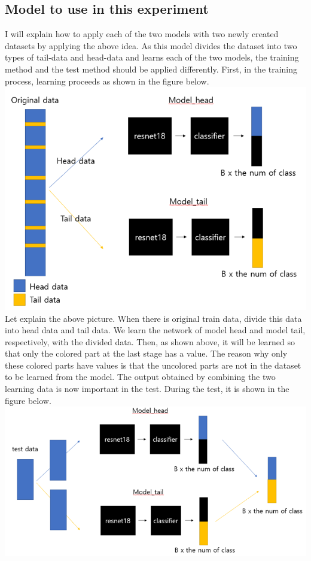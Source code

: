 \documentclass[extendedabs]{bmvc2k}
\begin{document}
  \subsection{Model to use in this experiment}
    \quad I will explain how to apply each of the two models with two newly created datasets by applying the above idea.
    As this model divides the dataset into two types of tail-data and head-data and learns each of the two models, 
    the training method and the test method should be applied differently. First, in the training process, learning proceeds as shown in the figure below.
    \newline  \includegraphics[width=\linewidth]{images/04_project.PNG}
    Let explain the above picture. When there is original train data, divide this data into head data and tail data. We learn the network of model head 
    and model tail, respectively, with the divided data. Then, as shown above, it will be learned so that only the colored part at the last stage has a value. 
    The reason why only these colored parts have values is that the uncolored parts are not in the dataset to be learned from the model. 
    The output obtained by combining the two learning data is now important in the test. During the test, it is shown in the figure below.
    \newline  \includegraphics[width=\linewidth]{images/05_project.PNG}
\end{document}
